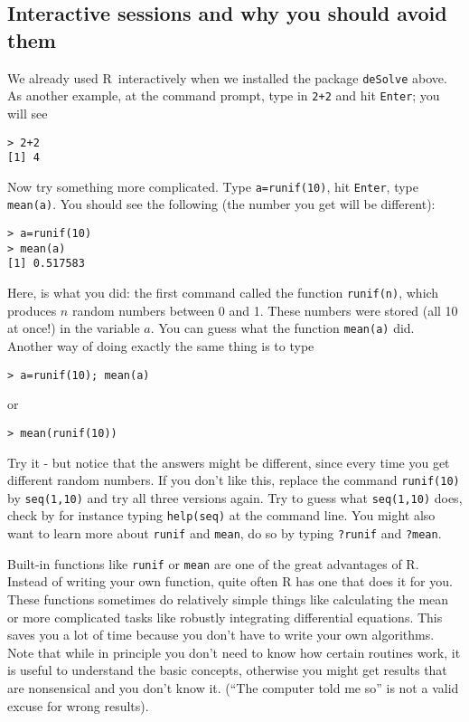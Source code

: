 \documentclass [11pt]{article}
\newcommand{\code}[1]{{\tt #1}}
\newcommand\R{{\sf R}}
\numberwithin{exercise}{section}
\begin{document}
\subsection{Interactive sessions and why you should avoid them \label{interactivesec}}
We already used \R\ interactively when we installed the package \code{deSolve} above. 
As another example, at the command prompt, type in \code{2+2} and hit \code{Enter}; you will see 
\vspace{-0.1in}
\begin{verbatim}
> 2+2 
[1] 4
\end{verbatim}
\vspace{-0.1in}
Now try something more complicated. Type \code{a=runif(10)}, hit \code{Enter}, type \code{mean(a)}. You should see the following (the number you get will be different):
\vspace{-0.1in}
\begin{verbatim}
> a=runif(10)
> mean(a)
[1] 0.517583
\end{verbatim}
\vspace{-0.1in}
Here, is what you did: the first command called the function \code{runif(n)}, which produces $n$ random numbers between 0 and 1. These numbers were stored (all 10 at once!) in the variable $a$. You can guess what the function \code{mean(a)} did. 
Another way of doing exactly the same thing is to type 
\vspace{-0.1in}
\begin{verbatim}
> a=runif(10); mean(a)
\end{verbatim}
\vspace{-0.1in}
or  
\vspace{-0.1in}
\begin{verbatim}
> mean(runif(10))
\end{verbatim}
\vspace{-0.1in}
Try it - but notice that the answers might be different, since every time you get different random numbers. If you don't like this, replace the command \code{runif(10)} by \code{seq(1,10)} and try all three versions again. Try to guess what \code{seq(1,10)} does, check by for instance typing \code{help(seq)} at the command line. You might also want to learn more about \code{runif} and \code{mean}, do so by typing \code{?runif} and \code{?mean}.

Built-in functions like \code{runif} or \code{mean} are one of the great advantages of R. Instead of writing your own function, quite often R has one that does it for you. These functions sometimes do relatively simple things like calculating the mean or more complicated tasks like robustly integrating differential equations. This saves you a lot of time because you don't have to write your own algorithms. Note that while in principle you don't need to know how certain routines work, it is useful to understand the basic concepts, otherwise you might get results that are nonsensical and you don't know it. (``The computer told me so'' is not a valid excuse for wrong results). 
\end{document}
